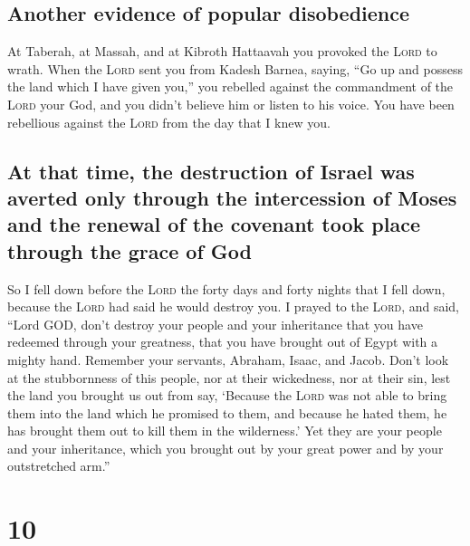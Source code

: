 \hypertarget{another-evidence-of-popular-disobedience}{%
\subsection{Another evidence of popular
disobedience}\label{another-evidence-of-popular-disobedience}}

 At Taberah, at Massah, and at Kibroth Hattaavah you
provoked the \textsc{Lord} to wrath.  When the
\textsc{Lord} sent you from Kadesh Barnea, saying, ``Go up and possess
the land which I have given you,'' you rebelled against the commandment
of the \textsc{Lord} your God, and you didn't believe him or listen to
his voice.  You have been rebellious against the
\textsc{Lord} from the day that I knew you.

\hypertarget{at-that-time-the-destruction-of-israel-was-averted-only-through-the-intercession-of-moses-and-the-renewal-of-the-covenant-took-place-through-the-grace-of-god}{%
\subsection{At that time, the destruction of Israel was averted only
through the intercession of Moses and the renewal of the covenant took
place through the grace of
God}\label{at-that-time-the-destruction-of-israel-was-averted-only-through-the-intercession-of-moses-and-the-renewal-of-the-covenant-took-place-through-the-grace-of-god}}

 So I fell down before the \textsc{Lord} the forty days
and forty nights that I fell down, because the \textsc{Lord} had said he
would destroy you.  I prayed to the \textsc{Lord}, and
said, ``Lord GOD, don't destroy your people and your inheritance that
you have redeemed through your greatness, that you have brought out of
Egypt with a mighty hand.  Remember your servants,
Abraham, Isaac, and Jacob. Don't look at the stubbornness of this
people, nor at their wickedness, nor at their sin,  lest
the land you brought us out from say, `Because the \textsc{Lord} was not
able to bring them into the land which he promised to them, and because
he hated them, he has brought them out to kill them in the wilderness.'
 Yet they are your people and your inheritance, which you
brought out by your great power and by your outstretched arm.''

\hypertarget{section-9}{%
\section{10}\label{section-9}}

